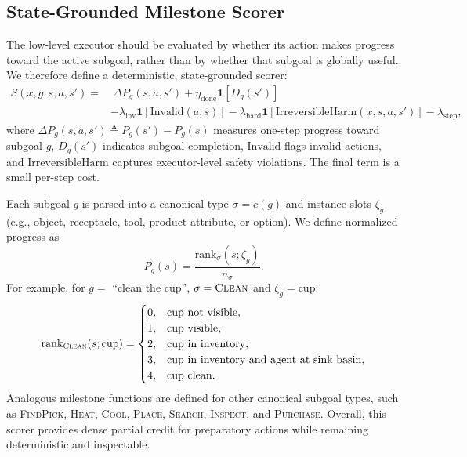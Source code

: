 \documentclass{article}
\begin{document}
\subsection{State-Grounded Milestone Scorer} %
The low-level executor should be evaluated by whether its action makes progress toward the active subgoal, rather than by whether that subgoal is globally useful. We therefore define a deterministic, state-grounded scorer:
\begin{equation}
\begin{aligned}
S(x,g,s,a,s')
=
&\ \Delta P_g(s,a,s')
+ \eta_{\mathrm{done}}\mathbf{1}[D_g(s')]  \\
&-\lambda_{\mathrm{inv}}\mathbf{1}[\mathrm{Invalid}(a,s)]
-\lambda_{\mathrm{hard}}\mathbf{1}[\mathrm{IrreversibleHarm}(x,s,a,s')]
-\lambda_{\mathrm{step}},
\end{aligned}
\label{eq:scorer}
\end{equation}
where $\Delta P_g(s,a,s')\triangleq P_g(s')-P_g(s)$ measures one-step progress toward subgoal $g$, $D_g(s')$ indicates subgoal completion, $\mathrm{Invalid}$ flags invalid actions, and $\mathrm{IrreversibleHarm}$ captures executor-level safety violations. The final term is a small per-step cost.

Each subgoal $g$ is parsed into a canonical type $\sigma=c(g)$ and instance slots $\zeta_g$ (e.g., object, receptacle, tool, product attribute, or option). We define normalized progress as
\begin{equation}
P_g(s)
=
\frac{\mathrm{rank}_{\sigma}(s;\zeta_g)}{n_{\sigma}}.
\label{eq:progress}
\end{equation}
For example, for $g=$ ``clean the cup'', $\sigma=\textsc{Clean}$ and $\zeta_g=\mathrm{cup}$:
\begin{equation}
\mathrm{rank}_{\textsc{Clean}}(s;\mathrm{cup})
=
\begin{cases}
0, & \text{cup not visible},\\
1, & \text{cup visible},\\
2, & \text{cup in inventory},\\
3, & \text{cup in inventory and agent at sink basin},\\
4, & \text{cup clean}.
\end{cases}
\label{eq:clean_rank}
\end{equation}
Analogous milestone functions are defined for other canonical subgoal types, such as \textsc{FindPick}, \textsc{Heat}, \textsc{Cool}, \textsc{Place}, \textsc{Search}, \textsc{Inspect}, and \textsc{Purchase}. Overall, this scorer provides dense partial credit for preparatory actions while remaining deterministic and inspectable.
\end{document}
